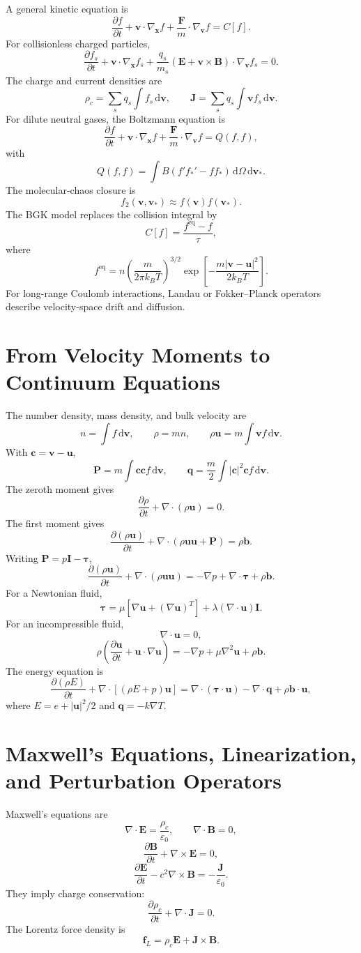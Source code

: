 \documentclass[11pt,openany]{book}
\newcommand{\dd}{\,\mathrm d}
\begin{document}
A general kinetic equation is
\[
\frac{\partial f}{\partial t}+\bm v\cdot\nabla_{\bm x}f+\frac{\bm F}{m}\cdot\nabla_{\bm v}f=C[f].
\]
For collisionless charged particles,
\[
\frac{\partial f_s}{\partial t}+\bm v\cdot\nabla_{\bm x}f_s+\frac{q_s}{m_s}(\bm E+\bm v\times\bm B)\cdot\nabla_{\bm v}f_s=0.
\]
The charge and current densities are
\[
\rho_c=\sum_s q_s\int f_s\dd\bm v,\qquad
\bm J=\sum_s q_s\int \bm v f_s\dd\bm v.
\]
For dilute neutral gases, the Boltzmann equation is
\[
\frac{\partial f}{\partial t}+\bm v\cdot\nabla_{\bm x}f+\frac{\bm F}{m}\cdot\nabla_{\bm v}f=Q(f,f),
\]
with
\[
Q(f,f)=\int B(f'f_*'-ff_*)\dd\Omega\dd\bm v_*.
\]
The molecular-chaos closure is
\[
f_2(\bm v,\bm v_*)\approx f(\bm v)f(\bm v_*).
\]
The BGK model replaces the collision integral by
\[
C[f]=\frac{f^{\mathrm{eq}}-f}{\tau},
\]
where
\[
f^{\mathrm{eq}}=n\left(\frac{m}{2\pi k_BT}\right)^{3/2}\exp\left[-\frac{m|\bm v-\bm u|^2}{2k_BT}\right].
\]
For long-range Coulomb interactions, Landau or Fokker--Planck operators describe velocity-space drift and diffusion.

\chapter*{From Velocity Moments to Continuum Equations}
The number density, mass density, and bulk velocity are
\[
n=\int f\dd\bm v,\qquad \rho=mn,\qquad \rho\bm u=m\int \bm v f\dd\bm v.
\]
With $\bm c=\bm v-\bm u$,
\[
\bm P=m\int \bm c\bm c f\dd\bm v,\qquad
\bm q=\frac{m}{2}\int |\bm c|^2\bm c f\dd\bm v.
\]
The zeroth moment gives
\[
\boxed{\frac{\partial\rho}{\partial t}+\nabla\cdot(\rho\bm u)=0}.
\]
The first moment gives
\[
\frac{\partial(\rho\bm u)}{\partial t}+\nabla\cdot(\rho\bm u\bm u+\bm P)=\rho\bm b.
\]
Writing $\bm P=p\bm I-\bm\tau$,
\[
\frac{\partial(\rho\bm u)}{\partial t}+\nabla\cdot(\rho\bm u\bm u)=-\nabla p+\nabla\cdot\bm\tau+\rho\bm b.
\]
For a Newtonian fluid,
\[
\bm\tau=\mu[\nabla\bm u+(\nabla\bm u)^T]+\lambda(\nabla\cdot\bm u)\bm I.
\]
For an incompressible fluid,
\[
\nabla\cdot\bm u=0,
\]
\[
\rho\left(\frac{\partial\bm u}{\partial t}+\bm u\cdot\nabla\bm u\right)=-\nabla p+\mu\nabla^2\bm u+\rho\bm b.
\]
The energy equation is
\[
\frac{\partial(\rho E)}{\partial t}+\nabla\cdot[(\rho E+p)\bm u]=\nabla\cdot(\bm\tau\cdot\bm u)-\nabla\cdot\bm q+\rho\bm b\cdot\bm u,
\]
where $E=e+|\bm u|^2/2$ and $\bm q=-k\nabla T$.

\chapter*{Maxwell's Equations, Linearization, and Perturbation Operators}
Maxwell's equations are
\[
\nabla\cdot\bm E=\frac{\rho_c}{\varepsilon_0},\qquad \nabla\cdot\bm B=0,
\]
\[
\frac{\partial\bm B}{\partial t}+\nabla\times\bm E=0,
\]
\[
\frac{\partial\bm E}{\partial t}-c^2\nabla\times\bm B=-\frac{\bm J}{\varepsilon_0}.
\]
They imply charge conservation:
\[
\frac{\partial\rho_c}{\partial t}+\nabla\cdot\bm J=0.
\]
The Lorentz force density is
\[
\bm f_L=\rho_c\bm E+\bm J\times\bm B.
\]
\end{document}
